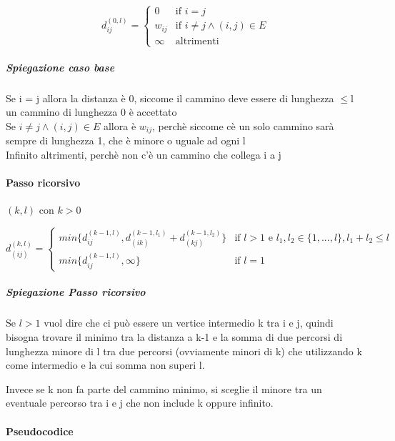 \documentclass[12pt, a4paper, openany]{book}
\begin{document}
\begin{equation*}
	d^{(0,l)}_{ij}= \begin{cases}
		0      & \text{if $i = j$}                      \\
		w_{ij} & \text{if $i \neq j \land (i,j) \in E$} \\
		\infty & \text{altrimenti}
	\end{cases}
\end{equation*}

\subparagraph{Spiegazione caso base}
Se i = j allora la distanza è 0, siccome il cammino deve essere di lunghezza $\leq$l un cammino di lunghezza 0 è accettato
\\Se $i \neq j \land (i,j) \in E$ allora è $w_{ij}$, perchè siccome cè un solo cammino sarà sempre di lunghezza 1, che è minore o uguale ad ogni l
\\Infinito altrimenti, perchè non c'è un cammino che collega i a j

\paragraph{Passo ricorsivo} $(k,l)$ con $k>0$

\begin{equation*}
	d^{(k,l)}_{(ij)} = \begin{cases}
		min\{d^{(k-1,l)}_{ij}, d^{(k-1,l_1)}_{(ik)} + d^{(k-1,l_2)}_{(kj)}  \} & \text{if $l > 1$ e $l_1,l_2\in\{1,...,l\}, l_1+l_2\leq l$ } \\
		min\{d^{(k-1,l)}_{ij}, \infty \}                                       & \text{if $l = 1$}
	\end{cases}
\end{equation*}

\subparagraph*{Spiegazione Passo ricorsivo}
Se $l > 1$ vuol dire che ci può essere un vertice intermedio k tra i e j, quindi bisogna trovare il minimo tra
la distanza a k-1 e la somma di due percorsi di lunghezza minore di l tra due percorsi (ovviamente minori di k) che utilizzando k come intermedio e la
cui somma non superi l.

Invece se k non fa parte del cammino minimo, si sceglie il minore tra un eventuale percorso tra i e j che non include k oppure infinito.

\paragraph{Pseudocodice}
\end{document}
